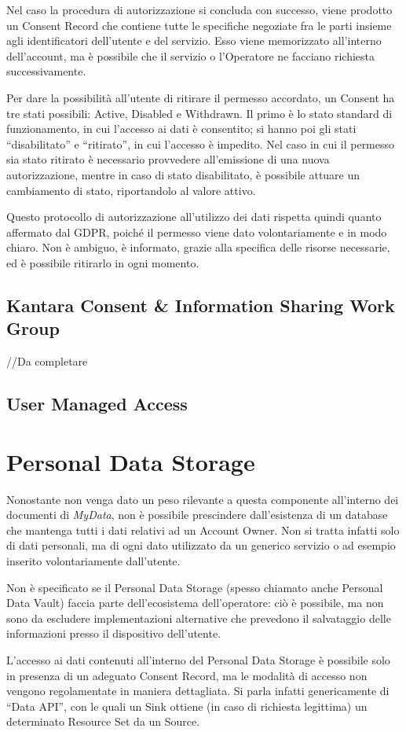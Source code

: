 Nel caso la procedura di autorizzazione si concluda con successo, viene prodotto un Consent Record che contiene tutte le specifiche negoziate fra le parti insieme agli identificatori dell’utente e del servizio. Esso viene memorizzato all’interno dell’account, ma \`e possibile che il servizio o l’Operatore ne facciano richiesta successivamente. 

Per dare la possibilit\`a all’utente di ritirare il permesso accordato, un Consent ha tre stati possibili: Active, Disabled e Withdrawn. Il primo \`e lo stato standard di funzionamento, in cui l’accesso ai dati \`e consentito; si hanno poi gli stati “disabilitato” e “ritirato”, in cui l’accesso \`e impedito. Nel caso in cui il permesso sia stato ritirato \`e necessario provvedere all’emissione di una nuova autorizzazione, mentre in caso di stato disabilitato, \`e possibile attuare un cambiamento di stato, riportandolo al valore attivo.

Questo protocollo di autorizzazione all’utilizzo dei dati rispetta quindi quanto affermato dal GDPR, poich\'e il permesso viene dato volontariamente e in modo chiaro. Non \`e ambiguo, \`e informato, grazie alla specifica delle risorse necessarie, ed \`e possibile ritirarlo in ogni momento.

\subsection{Kantara Consent \& Information Sharing Work Group}
//Da completare

\cite{kantaraconsent}

\subsection{User Managed Access}
\cite{uma}

\section{Personal Data Storage}
Nonostante non venga dato un peso rilevante a questa componente all’interno dei documenti di \textit{MyData}, non \`e possibile prescindere dall’esistenza di un database che mantenga tutti i dati relativi ad un Account Owner. Non si tratta infatti solo di dati personali, ma di ogni dato utilizzato da un generico servizio o ad esempio inserito volontariamente dall’utente.

Non \`e specificato se il Personal Data Storage (spesso chiamato anche Personal Data Vault) faccia parte dell’ecosistema dell’operatore: ci\`o \`e possibile, ma non sono da escludere implementazioni alternative che prevedono il salvataggio delle informazioni presso il dispositivo dell’utente.

L’accesso ai dati contenuti all’interno del Personal Data Storage \`e possibile solo in presenza di un adeguato Consent Record, ma le modalit\`a di accesso non vengono regolamentate in maniera dettagliata. Si parla infatti genericamente di “Data API”, con le quali un Sink ottiene (in caso di richiesta legittima) un determinato Resource Set da un Source.


